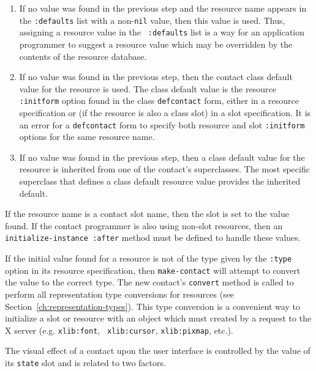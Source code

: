 \documentclass[twoside]{book}
\begin{document}
\begin{sloppy}
\begin{flushright}
{\begin{enumerate}
\item If no value was found in the previous step and the resource name
appears in the {\tt :defaults} list  with a non-{\tt nil} value, then
this value is used. Thus, assigning a resource value in the {\tt
:defaults} list is a
way for an application programmer to suggest a resource value which may be
overridden by the contents of the resource database.

\item If no value was found in the previous step, then the contact class
default value for the resource is used. The class default value is the
resource {\tt :initform} option found in the class {\tt defcontact} form,
either in a resource specification or (if the
resource is also a class slot) in a slot specification. It is an error for a
{\tt defcontact} form to specify both resource and slot {\tt :initform}
options for the same resource name.

\item If no value was found in the previous step, then a class default value
for the resource is inherited from one of the contact's superclasses. The
most specific superclass that defines a class default resource value provides
the inherited default. \end{enumerate} }

\parbox[t]{6.125in}{
If the resource name is a contact slot name, then the slot is set to the
value found. If the contact programmer is also using non-slot resources, then an
{\tt initialize-instance :after} method must be defined to handle these values.
}


\parbox[t]{6.125in}{ If the initial value found for a resource is not of the
type given by the {\tt :type} option in its resource specification,
then
{\tt make-contact} will attempt to convert the value to the correct type. The
new contact's {\tt convert} method is called to perform all representation type
conversions for resources (see
Section~\ref{ch:representation-types}). 
This type
conversion is a convenient way to initialize a slot or resource with an object
which must created by a request to the X server (e.g. {\tt xlib:font}, {\tt
xlib:cursor}, {\tt xlib:pixmap}, etc.).

}\end{flushright}



The visual effect of a contact upon the user interface is controlled by the
value of its {\tt state} slot and is related to two
factors\footnotemark{}.
\begin{itemize}


\end{itemize}
\end{sloppy}
\end{document}
